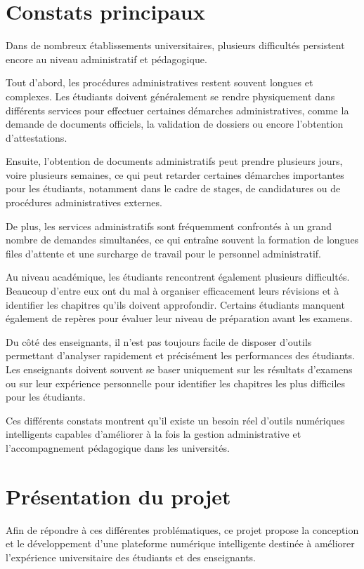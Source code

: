 \documentclass[12pt,a4paper]{report}
\begin{document}
\section{Constats principaux}
Dans de nombreux établissements universitaires, plusieurs difficultés persistent encore au niveau administratif et pédagogique.

Tout d'abord, les procédures administratives restent souvent longues et complexes. Les étudiants doivent généralement se rendre physiquement dans différents services pour effectuer certaines démarches administratives, comme la demande de documents officiels, la validation de dossiers ou encore l'obtention d'attestations.

Ensuite, l'obtention de documents administratifs peut prendre plusieurs jours, voire plusieurs semaines, ce qui peut retarder certaines démarches importantes pour les étudiants, notamment dans le cadre de stages, de candidatures ou de procédures administratives externes.

De plus, les services administratifs sont fréquemment confrontés à un grand nombre de demandes simultanées, ce qui entraîne souvent la formation de longues files d'attente et une surcharge de travail pour le personnel administratif.

Au niveau académique, les étudiants rencontrent également plusieurs difficultés. Beaucoup d'entre eux ont du mal à organiser efficacement leurs révisions et à identifier les chapitres qu'ils doivent approfondir. Certains étudiants manquent également de repères pour évaluer leur niveau de préparation avant les examens.

Du côté des enseignants, il n'est pas toujours facile de disposer d'outils permettant d'analyser rapidement et précisément les performances des étudiants. Les enseignants doivent souvent se baser uniquement sur les résultats d'examens ou sur leur expérience personnelle pour identifier les chapitres les plus difficiles pour les étudiants.

Ces différents constats montrent qu'il existe un besoin réel d'outils numériques intelligents capables d'améliorer à la fois la gestion administrative et l'accompagnement pédagogique dans les universités.

\section{Présentation du projet}
Afin de répondre à ces différentes problématiques, ce projet propose la conception et le développement d'une plateforme numérique intelligente destinée à améliorer l'expérience universitaire des étudiants et des enseignants.
\end{document}
